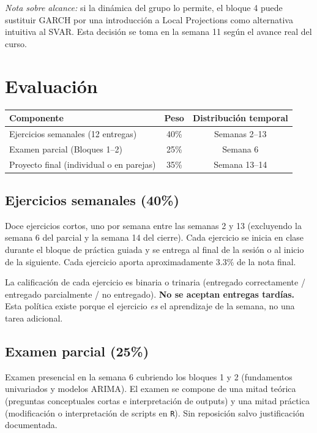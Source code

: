 \documentclass[11pt,letterpaper]{article}
\begin{document}
\textit{Nota sobre alcance:} si la dinámica del grupo lo permite, el bloque 4 puede sustituir GARCH por una introducción a Local Projections como alternativa intuitiva al SVAR. Esta decisión se toma en la semana 11 según el avance real del curso.

\section{Evaluación}

\begin{tabular}{@{}p{6.5cm} c c@{}}
\toprule
\textbf{Componente} & \textbf{Peso} & \textbf{Distribución temporal} \\
\midrule
Ejercicios semanales (12 entregas) & 40\% & Semanas 2--13 \\
Examen parcial (Bloques 1--2) & 25\% & Semana 6 \\
Proyecto final (individual o en parejas) & 35\% & Semana 13--14 \\
\bottomrule
\end{tabular}

\subsection*{Ejercicios semanales (40\%)}

Doce ejercicios cortos, uno por semana entre las semanas 2 y 13 (excluyendo la semana 6 del parcial y la semana 14 del cierre). Cada ejercicio se inicia en clase durante el bloque de práctica guiada y se entrega al final de la sesión o al inicio de la siguiente. Cada ejercicio aporta aproximadamente 3.3\% de la nota final.

La calificación de cada ejercicio es binaria o trinaria (entregado correctamente / entregado parcialmente / no entregado). \textbf{No se aceptan entregas tardías.} Esta política existe porque el ejercicio \emph{es} el aprendizaje de la semana, no una tarea adicional.

\subsection*{Examen parcial (25\%)}

Examen presencial en la semana 6 cubriendo los bloques 1 y 2 (fundamentos univariados y modelos ARIMA). El examen se compone de una mitad teórica (preguntas conceptuales cortas e interpretación de outputs) y una mitad práctica (modificación o interpretación de scripts en \texttt{R}). Sin reposición salvo justificación documentada.
\end{document}

